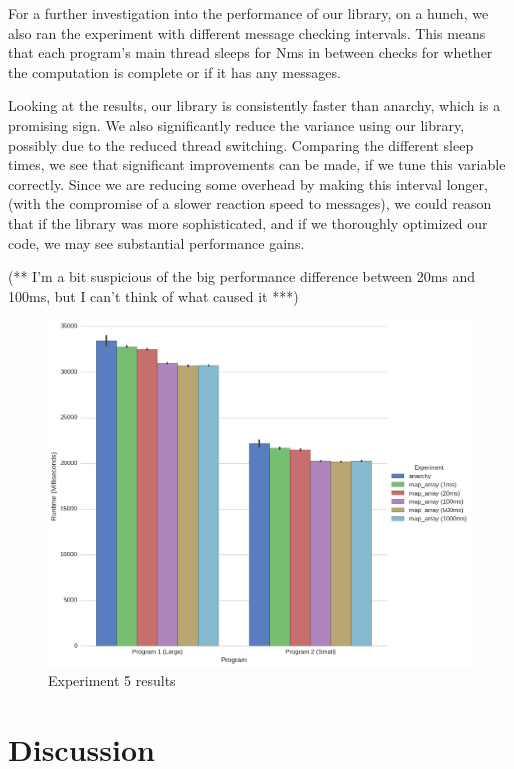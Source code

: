 For a further investigation into the performance of our library, on a hunch, we also ran the experiment with different message checking intervals. This means that each program's main thread sleeps for Nms in between checks for whether the computation is complete or if it has any messages.

Looking at the results, our library is consistently faster than anarchy, which is a promising sign. We also significantly reduce the variance using our library, possibly due to the reduced thread switching. Comparing the different sleep times, we see that significant improvements can be made, if we tune this variable correctly. Since we are reducing some overhead by making this interval longer, (with the compromise of a slower reaction speed to messages), we could reason that if the library was more sophisticated, and if we thoroughly optimized our code, we may see substantial performance gains.

(** I'm a bit suspicious of the big performance difference between 20ms and 100ms, but I can't think of what caused it ***)



\begin{figure}
	\centering
	\includegraphics[width=\textwidth]{graphics/experiment5.png}
	\caption{Experiment 5 results}
	\label{fig:results_ex5}
\end{figure}





\section{Discussion}

